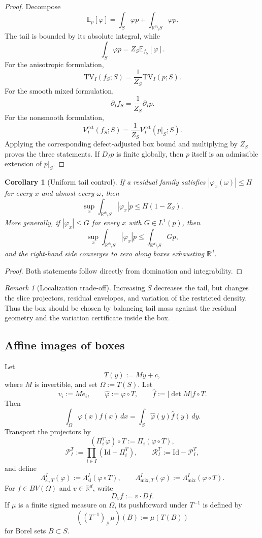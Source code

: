 \documentclass[11pt,letterpaper]{article}
\newtheorem{corollary}[theorem]{Corollary}
\theoremstyle{definition}
\theoremstyle{remark}
\newtheorem{remark}[theorem]{Remark}
\newcommand{\Id}{\mathrm{Id}}
\newcommand{\TV}{\mathrm{TV}}
\begin{document}
\begin{proof}
Decompose
$$
\mathbb E_p[\varphi]
=
\int_S\varphi p
+
\int_{\mathbb R^d\setminus S}\varphi p.
$$
The tail is bounded by its absolute integral, while
$$
\int_S\varphi p
=
Z_S\mathbb E_{f_S}[\varphi].
$$
For the anisotropic formulation,
$$
\TV_I(f_S;S)=\frac1{Z_S}\TV_I(p;S).
$$
For the smooth mixed formulation,
$$
\partial_If_S=\frac1{Z_S}\partial_Ip.
$$
For the nonsmooth formulation,
$$
V_I^{\mathrm{ext}}(f_S;S)
=
\frac1{Z_S}V_I^{\mathrm{ext}}(p|_S;S).
$$
Applying the corresponding defect-adjusted box bound and multiplying by $Z_S$
proves the three statements. If $D_Ip$ is finite globally, then $p$ itself is
an admissible extension of $p|_S$.
\end{proof}

\begin{corollary}[Uniform tail control]
\label{cor:appendix_uniform_tail_control}
If a residual family satisfies $|\varphi_x(\omega)|\le H$ for every $x$ and
almost every $\omega$, then
$$
\sup_x\int_{\mathbb R^d\setminus S}|\varphi_x|p
\le
H(1-Z_S).
$$
More generally, if $|\varphi_x|\le G$ for every $x$ with $G\in L^1(p)$, then
$$
\sup_x\int_{\mathbb R^d\setminus S}|\varphi_x|p
\le
\int_{\mathbb R^d\setminus S}Gp,
$$
and the right-hand side converges to zero along boxes exhausting
$\mathbb R^d$.
\end{corollary}

\begin{proof}
Both statements follow directly from domination and integrability.
\end{proof}

\begin{remark}[Localization trade-off]
\label{rem:appendix_localization_tradeoff}
Increasing $S$ decreases the tail, but changes the slice projectors, residual
envelopes, and variation of the restricted density. Thus the box should be
chosen by balancing tail mass against the residual geometry and the
variation certificate inside the box.
\end{remark}

  
\subsection{Affine images of boxes}
\label{subsec:appendix_affine_images_boxes}
  

Let
$$
T(y):=My+c,
$$
where $M$ is invertible, and set $\Omega:=T(S)$. Let
$$
v_i:=Me_i,
\qquad
\widehat\varphi:=\varphi\circ T,
\qquad
\widehat f:=|\det M|f\circ T.
$$
Then
$$
\int_\Omega\varphi(x)f(x)\,dx
=
\int_S\widehat\varphi(y)\widehat f(y)\,dy.
$$
Transport the projectors by
$$
(\Pi_i^T\varphi)\circ T
:=
\Pi_i(\varphi\circ T),
$$
$$
\mathcal P_I^T:=\prod_{i\in I}(\Id-\Pi_i^T),
\qquad
\mathcal R_I^T:=\Id-\mathcal P_I^T,
$$
and define
$$
\Lambda_{\mathrm{sl},T}^I(\varphi)
:=
\Lambda_{\mathrm{sl}}^I(\varphi\circ T),
\qquad
\Lambda_{\mathrm{mix},T}^I(\varphi)
:=
\Lambda_{\mathrm{mix}}^I(\varphi\circ T).
$$
For $f\in BV(\Omega)$ and $v\in\mathbb R^d$, write
$$
D_vf:=v\cdot Df.
$$
If $\mu$ is a finite signed measure on $\Omega$, its pushforward under
$T^{-1}$ is defined by
$$
((T^{-1})_\#\mu)(B):=\mu(T(B))
$$
for Borel sets $B\subset S$.
\end{document}
